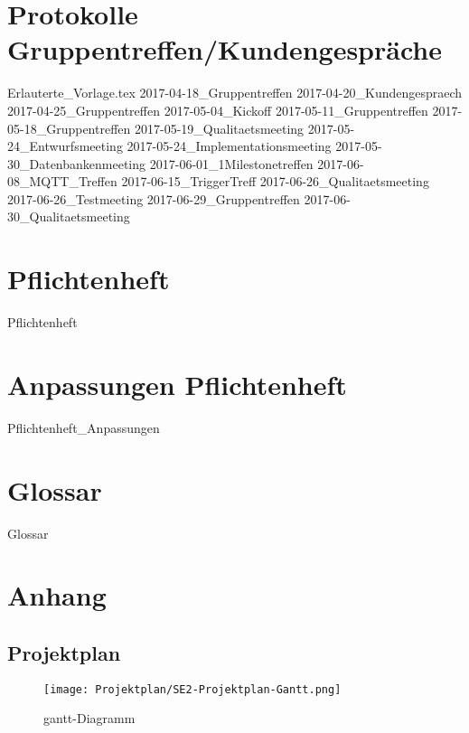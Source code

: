\documentclass{scrreprt}
\begin{document}
\chapter{Protokolle Gruppentreffen/Kundengespräche}
{Erlauterte_Vorlage.tex}\clearpage
{2017-04-18_Gruppentreffen}\clearpage
{2017-04-20_Kundengespraech}\clearpage
{2017-04-25_Gruppentreffen}\clearpage
{2017-05-04_Kickoff}\clearpage
{2017-05-11_Gruppentreffen}\clearpage
{2017-05-18_Gruppentreffen}\clearpage
{2017-05-19_Qualitaetsmeeting}\clearpage
{2017-05-24_Entwurfsmeeting}\clearpage
{2017-05-24_Implementationsmeeting}\clearpage
{2017-05-30_Datenbankenmeeting}\clearpage
{2017-06-01_1Milestonetreffen}\clearpage
{2017-06-08_MQTT_Treffen}\clearpage
{2017-06-15_TriggerTreff}\clearpage
{2017-06-26_Qualitaetsmeeting}\clearpage
{2017-06-26_Testmeeting}\clearpage
{2017-06-29_Gruppentreffen}\clearpage
{2017-06-30_Qualitaetsmeeting}

\chapter{Pflichtenheft}
{Pflichtenheft}

\chapter{Anpassungen Pflichtenheft}
{Pflichtenheft_Anpassungen}

\chapter{Glossar}
{Glossar}

\chapter{Anhang}
\section{Projektplan}
\clearpage
\begin{figure}[!ht]
\centering
\texttt{[image: Projektplan/SE2-Projektplan-Gantt.png]}
\caption{gantt-Diagramm}
\end{figure}
\end{document}
